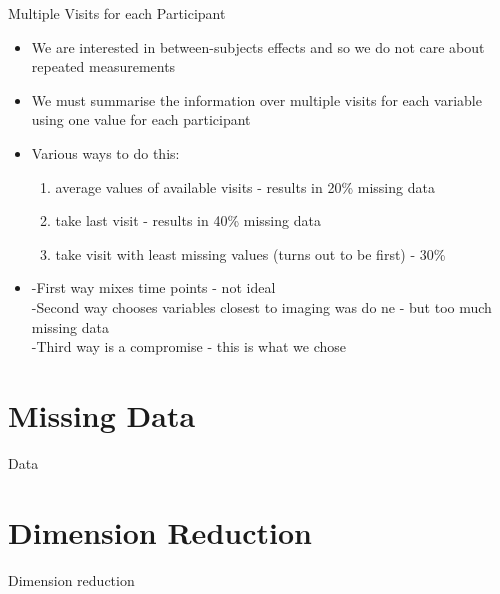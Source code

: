 \documentclass[10pt]{beamer} %
\begin{document}
\begin{frame}[plain]{Multiple Visits for each Participant}

\begin{itemize}
\item We are interested in between-subjects effects and so we do not care about repeated measurements \\

\vspace{0.3cm}

\item We must summarise the information over multiple visits for each variable using one value for each participant \\

\vspace{0.3cm}

\item Various ways to do this:

\vspace{0.3cm}

\begin{enumerate}
\item average values of available visits - results in 20\% missing data
\item take last visit - results in 40\% missing data
\item take visit with least missing values (turns out to be first) -  30\%
\end{enumerate} 

\vspace{0.3cm}

\item -First way mixes time points - not ideal \\ -Second way chooses variables closest to imaging was do	ne - but too much missing data \\ -Third way is a compromise - this is what we chose
\end{itemize}
\end{frame}


\section{Missing Data}
\begin{frame}[plain]{Data}

\end{frame}



\section{Dimension Reduction}
\begin{frame}[plain]{Dimension reduction}

\end{frame}
\end{document}
